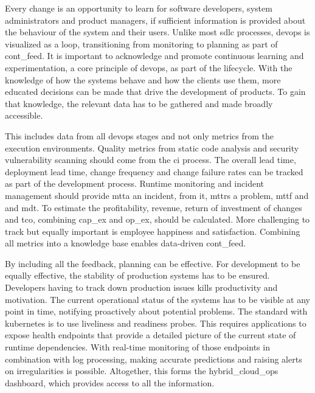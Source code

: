 \documentclass[../main.tex]{subfiles}
\begin{document}
    Every change is an opportunity to learn for software developers, system administrators and product managers, if sufficient information is provided about the behaviour of the system and their users.
    Unlike most \acrlong{sdlc} processes, \gls{devops} is visualized as a loop, transitioning from monitoring to planning as part of \gls{cont_feed}.
    It is important to acknowledge and promote continuous learning and experimentation, a core principle of \gls{devops}, as part of the lifecycle.
    With the knowledge of how the systems behave and how the clients use them, more educated decisions can be made that drive the development of products.
    To gain that knowledge, the relevant data has to be gathered and made broadly accessible.

    This includes data from all \gls{devops} stages and not only metrics from the execution environments.
    Quality metrics from static code analysis and security vulnerability scanning should come from the \acrlong{ci} process.
    The overall lead time, deployment lead time, change frequency and change failure rates can be tracked as part of the development process.
    Runtime monitoring and incident management should provide \acrlong{mtta} an incident,  from it, \acrlong{mttrs} a problem, \acrlong{mttf} and  and \acrlong{mdt}.
    To estimate the profitability, revenue, return of investment of changes and \acrlong{tco}, combining \gls{cap_ex} and \gls{op_ex}, should be calculated.
    More challenging to track but equally important is employee happiness and satisfaction.
    Combining all metrics into a knowledge base enables data-driven \gls{cont_feed}.

    By including all the feedback, planning can be effective.
    For development to be equally effective, the stability of production systems has to be ensured.
    Developers having to track down production issues kills productivity and motivation.
    The current operational status of the systems has to be visible at any point in time, notifying proactively about potential problems.
    The standard with \gls{kubernetes} is to use liveliness and readiness probes.
    This requires applications to expose health endpoints that provide a detailed picture of the current state of runtime dependencies.
    With real-time monitoring of those endpoints in combination with log processing, making accurate predictions and raising alerts on irregularities is possible.
    Altogether, this forms the \gls{hybrid_cloud_ops} dashboard, which provides access to all the information.
\end{document}
